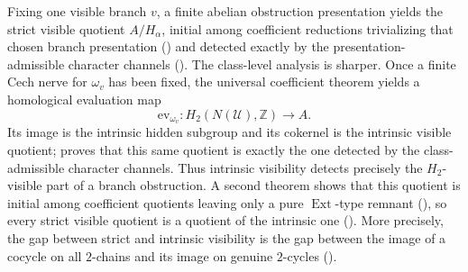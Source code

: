 Fixing one visible branch $v$, a finite abelian obstruction presentation yields the strict visible quotient $A/H_\alpha$, initial among coefficient reductions trivializing that chosen branch presentation () and detected exactly by the presentation-admissible character channels (). The class-level analysis is sharper. Once a finite Cech nerve for $\omega_v$ has been fixed, the universal coefficient theorem yields a homological evaluation map
\[
\mathrm{ev}_{\omega_v}:H_2(N(\mathcal U),\mathbb Z)\to A.
\]
Its image is the intrinsic hidden subgroup and its cokernel is the intrinsic visible quotient;  proves that this same quotient is exactly the one detected by the class-admissible character channels. Thus intrinsic visibility detects precisely the $H_2$-visible part of a branch obstruction. A second theorem shows that this quotient is initial among coefficient quotients leaving only a pure $\operatorname{Ext}$-type remnant (), so every strict visible quotient is a quotient of the intrinsic one (). More precisely, the gap between strict and intrinsic visibility is the gap between the image of a cocycle on all $2$-chains and its image on genuine $2$-cycles ().

